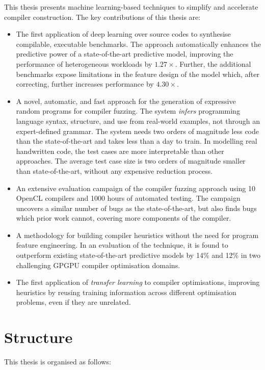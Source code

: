 This thesis presents machine learning-based techniques to simplify and accelerate compiler construction. The key contributions of this thesis are:

\begin{itemize}
  \item The first application of deep learning over source codes to synthesise compilable, executable benchmarks. The approach automatically enhances the predictive power of a state-of-the-art predictive model, improving the performance of heterogeneous workloads by $1.27\times$. Further, the additional benchmarks expose limitations in the feature design of the model which, after correcting, further increases performance by $4.30\times$.
  \item A novel, automatic, and fast approach for the generation of expressive random programs for compiler fuzzing. The system \emph{infers} programming language syntax, structure, and use from real-world examples, not through an expert-defined grammar. The system needs two orders of magnitude less code than the state-of-the-art and takes less than a day to train. In modelling real handwritten code, the test cases are more interpretable than other approaches. The average test case size is two orders of magnitude smaller than state-of-the-art, without any expensive reduction process.
  \item An extensive evaluation campaign of the compiler fuzzing approach using 10 OpenCL compilers and 1000 hours of automated testing. The campaign uncovers a similar number of bugs as the state-of-the-art, but also finds bugs which prior work cannot, covering more components of the compiler.
	\item A methodology for building compiler heuristics without the need for program feature engineering. In an evaluation of the technique, it is found to outperform existing state-of-the-art predictive models by 14\% and 12\% in two challenging GPGPU compiler optimisation domains.
	\item The first application of \emph{transfer learning} to compiler optimisations, improving heuristics by reusing training information across different optimisation problems, even if they are unrelated.
\end{itemize}

\newpage
\section{Structure}

This thesis is organised as follows:


